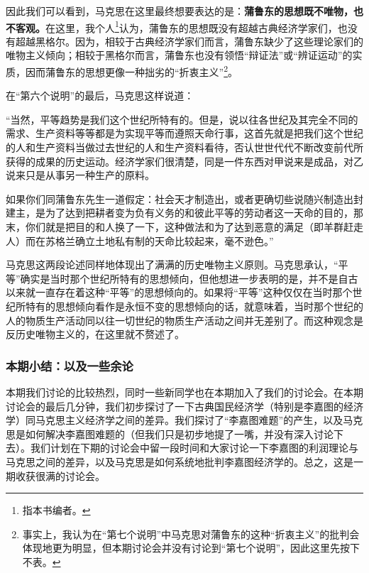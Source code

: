 \documentclass[a4paper,twoside,12pt,AutoFakeBold]{ctexart}
\begin{document}
因此我们可以看到，马克思在这里最终想要表达的是：\textbf{蒲鲁东的思想既不唯物，也不客观。}在这里，我个人\footnote{指本书编者。}认为，蒲鲁东的思想既没有超越古典经济学家们，也没有超越黑格尔。因为，相较于古典经济学家们而言，蒲鲁东缺少了这些理论家们的唯物主义倾向；相较于黑格尔而言，蒲鲁东也没有领悟“辩证法”或“辨证运动”的实质，因而蒲鲁东的思想更像一种拙劣的“折衷主义”\footnote{事实上，我认为在“第七个说明”中马克思对蒲鲁东的这种“折衷主义”的批判会体现地更为明显，但本期讨论会并没有讨论到“第七个说明”，因此这里先按下不表。}。

在“第六个说明”的最后，马克思这样说道：
\begin{adjustwidth}{2em}{2em}
    \qquad\fangsong
    “当然，平等趋势是我们这个世纪所特有的。但是，说以往各世纪及其完全不同的需求、生产资料等等都是为实现平等而遵照天命行事，这首先就是把我们这个世纪的人和生产资料当做过去世纪的人和生产资料看待，否认世世代代不断改变前代所获得的成果的历史运动。经济学家们很清楚，同是一件东西对甲说来是成品，对乙说来只是从事另一种生产的原料。
    
    如果你们同蒲鲁东先生一道假定：社会天才制造出，或者更确切些说随兴制造出封建主，是为了达到把耕者变为负有义务的和彼此平等的劳动者这一天命的目的，那末，你们就是把目的和人换了一下，这种做法和为了达到恶意的满足（即羊群赶走人）而在苏格兰确立土地私有制的天命比较起来，毫不逊色。”
\end{adjustwidth}

马克思这两段论述同样地体现出了满满的历史唯物主义原则。马克思承认，“平等”确实是当时那个世纪所特有的思想倾向，但他想进一步表明的是，并不是自古以来就一直存在着这种“平等”的思想倾向的。如果将“平等”这种仅仅在当时那个世纪所特有的思想倾向看作是永恒不变的思想倾向的话，就意味着，当时那个世纪的人的物质生产活动同以往一切世纪的物质生产活动之间并无差别了。而这种观念是反历史唯物主义的，在这里就不赘述了。

\subsubsection{本期小结：以及一些余论}
本期我们讨论的比较热烈，同时一些新同学也在本期加入了我们的讨论会。在本期讨论会的最后几分钟，我们初步探讨了一下古典国民经济学（特别是李嘉图的经济学）同马克思主义经济学之间的差异。我们探讨了“李嘉图难题”的产生，以及马克思是如何解决李嘉图难题的（但我们只是初步地提了一嘴，并没有深入讨论下去）。我们计划在下期的讨论会中留一段时间和大家讨论一下李嘉图的利润理论与马克思之间的差异，以及马克思是如何系统地批判李嘉图经济学的。总之，这是一期收获很满的讨论会。
\end{document}
